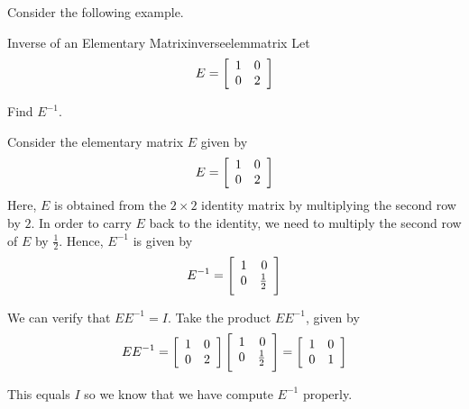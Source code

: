 Consider the following example.

\begin{example}{Inverse of an Elementary Matrix}{inverseelemmatrix}
Let 
\begin{equation*}
E
=
\left[
\begin{array}{rr}
1 & 0 \\
0 & 2
\end{array}
\right]
\end{equation*}

Find $E^{-1}$. 
\end{example}

\begin{solution}
Consider the elementary matrix $E$ given by 
\begin{equation*}
E
=
\left[
\begin{array}{rr}
1 & 0 \\
0 & 2
\end{array}
\right]
\end{equation*}
Here, $E$ is obtained from the $2 \times 2$ identity matrix by multiplying the second row by $2$. In order to carry $E$ back to the identity,
we need to multiply the second row of $E$ by $\frac{1}{2}$. 
Hence, $E^{-1}$ is given by
\begin{equation*}
E^{-1}
=
\leftB
\begin{array}{rr}
1 & 0 \\
0 & \vspace{0.05in}\frac{1}{2}
\end{array}
\rightB
\end{equation*}

We can verify that $EE^{-1}=I$. Take the product $EE^{-1}$, given by
\begin{equation*}
EE^{-1}
=
\leftB
\begin{array}{rr}
1 & 0 \\
0 & 2
\end{array}
\rightB
\leftB
\begin{array}{rr}
1 & 0 \\
0 & \vspace{0.05in}\frac{1}{2}
\end{array}
\rightB
=
\leftB
\begin{array}{rr}
1 & 0 \\
0 & 1
\end{array}
\rightB
\end{equation*}

This equals $I$ so we know that we have compute $E^{-1}$ properly. 
\end{solution}


